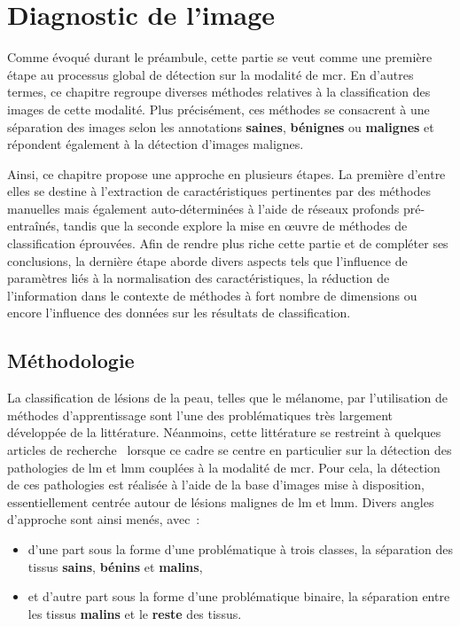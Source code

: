\renewcommand{\thechapter}{\arabic{chapter}}
\setcounter{chapter}{4}

\chapter{Diagnostic de l'image}
\label{chap:chapter_5}
\chapterintro
Comme évoqué durant le préambule, cette partie se veut comme une première étape au processus global de détection sur la modalité de \gls{mcr}. En d'autres termes, ce chapitre regroupe diverses méthodes relatives à la classification des images de cette modalité. Plus précisément, ces méthodes se consacrent à une séparation des images selon les annotations \textbf{saines}, \textbf{bénignes} ou \textbf{malignes} et répondent également à la détection d'images malignes.\par

Ainsi, ce chapitre propose une approche en plusieurs étapes. La première d'entre elles se destine à l'extraction de caractéristiques pertinentes par des méthodes manuelles mais également auto-déterminées à l'aide de réseaux profonds pré-entraînés, tandis que la seconde explore la mise en œuvre de méthodes de classification éprouvées. Afin de rendre plus riche cette partie et de compléter ses conclusions, la dernière étape aborde divers aspects tels que l'influence de paramètres liés à la normalisation des caractéristiques, la réduction de l'information dans le contexte de méthodes à fort nombre de dimensions ou encore l'influence des données sur les résultats de classification.\par	
\newpage

\section{Méthodologie}
La classification de lésions de la peau, telles que le mélanome, par l'utilisation de méthodes d'apprentissage sont l'une des problématiques très largement développée de la littérature. Néanmoins, cette littérature se restreint à quelques articles de recherche~\cite{Halimi2017a, Halimi2017b, Wiltgen2008, Koller2011} lorsque ce cadre se centre en particulier sur la détection des pathologies de \gls{lm} et \gls{lmm} couplées à la modalité de \gls{mcr}. Pour cela, la détection de ces pathologies est réalisée à l'aide de la base d'images mise à disposition, essentiellement centrée autour de lésions malignes de \gls{lm} et \gls{lmm}. Divers angles d'approche sont ainsi menés, avec~: 
\begin{itemize}
    \item d'une part sous la forme d'une problématique à trois classes, la séparation des tissus \textbf{sains}, \textbf{bénins} et \textbf{malins},
    \item et d'autre part sous la forme d'une problématique binaire, la séparation entre les tissus \textbf{malins} et le \textbf{reste} des tissus.
\end{itemize}\par

